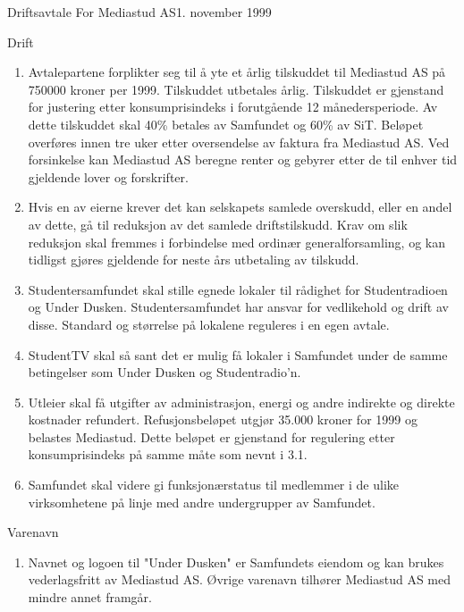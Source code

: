 \begin{instruks}{Driftsavtale For Mediastud AS}{1. november 1999}{}
	\begin{instruksledd}{Drift}
		\begin{enumerate}
		\item Avtalepartene forplikter seg til å yte et årlig tilskuddet
		til Mediastud AS på 750000 kroner per 1999.
		Tilskuddet utbetales årlig. Tilskuddet er gjenstand for
		justering etter konsumprisindeks i forutgående 12
		månedersperiode. Av dette tilskuddet skal 40\% betales av
		Samfundet og 60\% av SiT. Beløpet overføres
		innen tre uker etter oversendelse av faktura fra Mediastud AS.
		Ved forsinkelse kan Mediastud AS beregne
		renter og gebyrer etter de til enhver tid gjeldende lover og
		forskrifter.
		\item Hvis en av eierne krever det kan selskapets samlede
		overskudd, eller en andel av dette, gå til reduksjon av det
		samlede driftstilskudd. Krav om slik reduksjon skal fremmes i
		forbindelse med ordinær generalforsamling,
		og kan tidligst gjøres gjeldende for neste års utbetaling av
		tilskudd.
		\item Studentersamfundet skal stille egnede lokaler til rådighet
		for Studentradioen og Under Dusken.
		Studentersamfundet har ansvar for vedlikehold og drift av disse.
		Standard og størrelse på lokalene reguleres i
		en egen avtale.
		\item StudentTV skal så sant det er mulig få lokaler i Samfundet
		under de samme betingelser som Under Dusken
		og Studentradio'n.
		\item Utleier skal få utgifter av administrasjon, energi og
		andre indirekte og direkte kostnader refundert.
		Refusjonsbeløpet utgjør 35.000 kroner for 1999 og belastes
		Mediastud. Dette beløpet er gjenstand for
		regulering etter konsumprisindeks på samme måte som nevnt i
		3.1.
		\item Samfundet skal videre gi funksjonærstatus til medlemmer i
		de ulike virksomhetene på linje med andre
		undergrupper av Samfundet.
		\end{enumerate}
	\end{instruksledd}

	\begin{instruksledd}{Varenavn}
		\begin{enumerate}
		\item Navnet og logoen til "Under Dusken" er Samfundets eiendom
		og kan brukes vederlagsfritt av Mediastud AS.
		Øvrige varenavn tilhører Mediastud AS med mindre annet framgår.
		\end{enumerate}
	\end{instruksledd}


\end{instruks}
